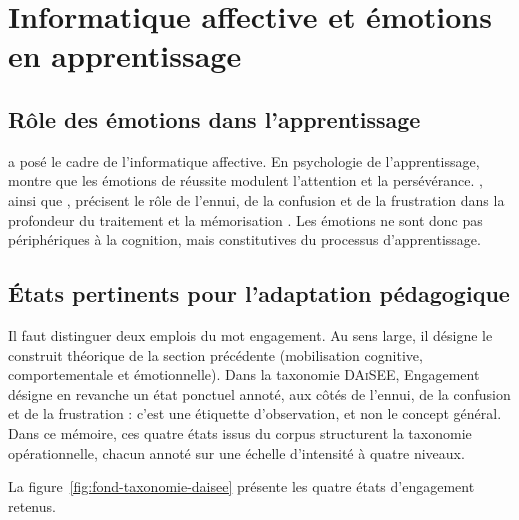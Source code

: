 \section{Informatique affective et émotions en apprentissage}
\label{sec:fond-affect}

\subsection{Rôle des émotions dans l'apprentissage}

\textcite{picard1997affective} a posé le cadre de l'informatique
affective. En psychologie de l'apprentissage,
\textcite{pekrun2006control} montre que les émotions de réussite modulent
l'attention et la persévérance. \textcite{dmello2012dynamics}, ainsi que
\textcite{baker2010better}, précisent le rôle de l'ennui, de la confusion et
de la frustration dans la profondeur du traitement et la mémorisation
\cite{loderer2020beyond,graesser2020emotions}. Les émotions ne sont
donc pas périphériques à la cognition, mais constitutives du processus
d'apprentissage.

\subsection{États pertinents pour l'adaptation pédagogique}

Il faut distinguer deux emplois du mot engagement. Au sens large, il
désigne le construit théorique de la section précédente (mobilisation
cognitive, comportementale et émotionnelle). Dans la taxonomie
\textsc{DAiSEE}, \og Engagement \fg{} désigne en revanche un état
ponctuel annoté, aux côtés de l'ennui, de la confusion et de la
frustration : c'est une étiquette d'observation, et non le concept
général. Dans ce mémoire, ces quatre états issus du corpus
\cite{gupta2016daisee} structurent la taxonomie opérationnelle, chacun
annoté sur une échelle d'intensité à quatre niveaux.


La figure~\ref{fig:fond-taxonomie-daisee} présente les quatre états d'engagement retenus.

